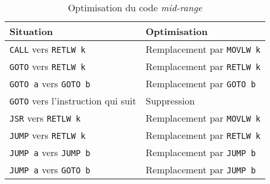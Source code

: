 \begin{table}[!ht]
  \centering
  \small
  \begin{tabular}{ll}
    \textbf{Situation} & \textbf{Optimisation} \\
    \hline
    \texttt{CALL} vers \texttt{RETLW k}  & Remplacement par \texttt{MOVLW k}\\
    \texttt{GOTO} vers \texttt{RETLW k}  & Remplacement par \texttt{RETLW k}\\
    \texttt{GOTO a} vers \texttt{GOTO b}  & Remplacement par \texttt{GOTO b}\\
    \texttt{GOTO} vers l'instruction qui suit  & Suppression\\
    \texttt{JSR} vers \texttt{RETLW k}  & Remplacement par \texttt{MOVLW k}\\
    \texttt{JUMP} vers \texttt{RETLW k}  & Remplacement par \texttt{RETLW k}\\
    \texttt{JUMP a} vers \texttt{JUMP b}  & Remplacement par \texttt{JUMP b}\\
    \texttt{JUMP a} vers \texttt{GOTO b}  & Remplacement par \texttt{JUMP b}\\
    \hline
  \end{tabular}
  \caption{Optimisation du code \emph{mid-range}}
\end{table}




